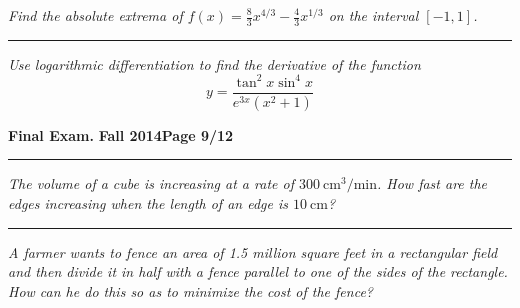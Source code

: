 \documentclass[12pt]{article}
\begin{document}
\bigskip
{\problem[10 pts] \em Find the absolute extrema of $f(x) = \frac{8}{3} x^{4/3} - \frac{4}{3} x^{1/3}$ on the interval $[-1,1]$.}
\vspace{6cm}
\begin{flushright}
\end{flushright}
\hrule
{\problem[10 pts] \em Use logarithmic differentiation to find the
  derivative of the function 
\begin{equation*}
y=\frac{\tan^2 x \sin^4 x}{e^{3x}(x^2+1)}
\end{equation*}
\vspace{7cm}
\begin{flushright}
\end{flushright}
\newpage

\hfill{\large\bf Final Exam.}\hfill{\large\bf
  Fall 2014}\hfill{\large\bf Page 9/12}\hrule

\bigskip
{\problem[10 pts] \em The volume of a cube is increasing at a rate of
  $300~\text{cm}^3/\text{min}$.  How fast are the edges increasing
  when the length of an edge is $10~\text{cm}$?}
\vspace{6cm}
\begin{flushright}
\end{flushright}
\hrule
{\problem[15 pts] \em A farmer wants to fence an area of 1.5 million square feet in a rectangular field and then divide it in half with a fence parallel to one of the sides of the rectangle.  How can he do this so as to minimize the cost of the fence?}
\vspace{11cm}
\begin{flushright}
\end{flushright}

}
\end{document}
